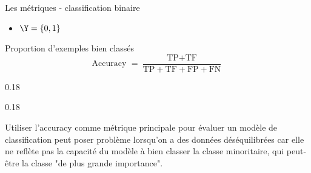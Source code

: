 \documentclass[10pt]{beamer}
\newcommand{\hsp}{\hspace*{1em}}
\begin{document}



\begin{frame}{Les métriques - classification binaire}
	\vspace*{-.8em}
	\begin{itemize}
		\item $\Y = \{0,1\}$\\[2em]
	\end{itemize}
	
	 \hsp Proportion d’exemples bien classés\\
	\pause
	$$ \text{Accuracy } = \dfrac{\text{TP} + \text{TF}}{\text{TP}+\text{TF}+\text{FP}+\text{FN}}$$
	
	\pause
	\begin{minipc}[0.06]{0.18}
		\warning
	\end{minipc}
	\begin{minipc}[0.93]{0.18}
		 
	\end{minipc}
	
Utiliser l'accuracy comme métrique principale pour évaluer un modèle de classification peut poser problème lorsqu'on a des données déséquilibrées car elle ne reflète pas la capacité du modèle à bien classer la classe minoritaire, qui peut-être la classe "de plus grande importance".
\end{frame}
\end{document}
